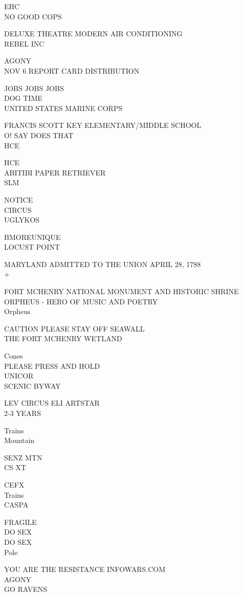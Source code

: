 \documentclass[10pt,letterpaper]{article}
\begin{document}
EHC\\
NO GOOD COPS

DELUXE THEATRE MODERN AIR CONDITIONING\\
REBEL INC

AGONY\\
NOV 6 REPORT CARD DISTRIBUTION

JOBS JOBS JOBS\\
DOG TIME\\
UNITED STATES MARINE CORPS

FRANCIS SCOTT KEY ELEMENTARY/MIDDLE SCHOOL\\
O! SAY DOES THAT\\
HCE

HCE\\
ABITIBI PAPER RETRIEVER\\
SLM

NOTICE\\
CIRCUS\\
UGLYKOS

BMOREUNIQUE\\
LOCUST POINT

MARYLAND ADMITTED TO THE UNION APRIL 28, 1788\\
+

FORT MCHENRY NATIONAL MONUMENT AND HISTORIC SHRINE\\
ORPHEUS {-} HERO OF MUSIC AND POETRY\\
Orpheus

CAUTION PLEASE STAY OFF SEAWALL\\
THE FORT MCHENRY WETLAND

Cones\\
PLEASE PRESS AND HOLD\\
UNICOR\\
SCENIC BYWAY

LEV CIRCUS ELI ARTSTAR\\
2{-}3 YEARS

Trains\\
Mountain

SENZ MTN\\
CS XT

CEFX\\
Trains\\
CASPA

FRAGILE\\
DO SEX\\
DO SEX\\
Pole

YOU ARE THE RESISTANCE INFOWARS.COM\\
AGONY\\
GO RAVENS
\end{document}
